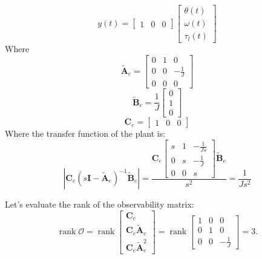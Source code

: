 \documentclass[11pt,a4paper,oneside]{book}
\numberwithin{equation}{section}
\DeclareMathOperator{\rank}{rank}
\theoremstyle{it}
\theoremstyle{definition}
\begin{document}
	\begin{equation} \label{example_1_eq6}
		y(t) =
		\begin{bmatrix}
			1 & 0 & 0
		\end{bmatrix}
		\begin{bmatrix}
			\theta(t) \\[6pt]
			\omega(t) \\[6pt]
			\tau_l(t) 
		\end{bmatrix}
	\end{equation} 
	Where
	\begin{equation}
		\tilde{\mathbf{A}}_e = \begin{bmatrix}
			0 & 1 & 0 \\[6pt]
			0 & 0 & -\frac{1}{J} \\[6pt]
			0 & 0 & 0
		\end{bmatrix}
	\end{equation}
	\begin{equation}
		\tilde{\mathbf{B}}_e = \frac{1}{J}\begin{bmatrix}
			0 \\[6pt]
			1 \\[6pt]
			0
		\end{bmatrix}
	\end{equation}
	\begin{equation}
		\mathbf{C}_e = \begin{bmatrix}
			1 & 0 & 0
		\end{bmatrix}
	\end{equation}
	Where the transfer function of the plant is:
	\begin{equation} \label{example_1_eq7}
		|\mathbf{C}_e(s\mathbf{I}-\tilde{\mathbf{A}}_e)^{-1}\tilde{\mathbf{B}}_e| = \frac{\mathbf{C}_e
			\begin{bmatrix}
				s & 1 & -\frac{1}{Js} \\[6pt]
				0 & s & -\frac{1}{J} \\[6pt]
				0 & 0 & s
			\end{bmatrix} \tilde{\mathbf{B}}_e
		}{s^2} = \frac{1}{Js^2}
	\end{equation}
	
	Let's evaluate the rank of the observability matrix:
	\begin{equation} \label{example_1_eq8}
		\rank{\mathcal{O}} = \rank \begin{bmatrix}
			\mathbf{C}_e  \\[6pt]
			\mathbf{C}_e\tilde{\mathbf{A}}_e \\[6pt]
			\mathbf{C}_e\tilde{\mathbf{A}}_e^2
		\end{bmatrix} = \rank
		\begin{bmatrix}
			1 & 0 & 0 \\[6pt]
			0 & 1 & 0 \\[6pt]
			0 & 0 & -\frac{1}{J}
		\end{bmatrix} = 3.
	\end{equation} 
	
\end{document}
